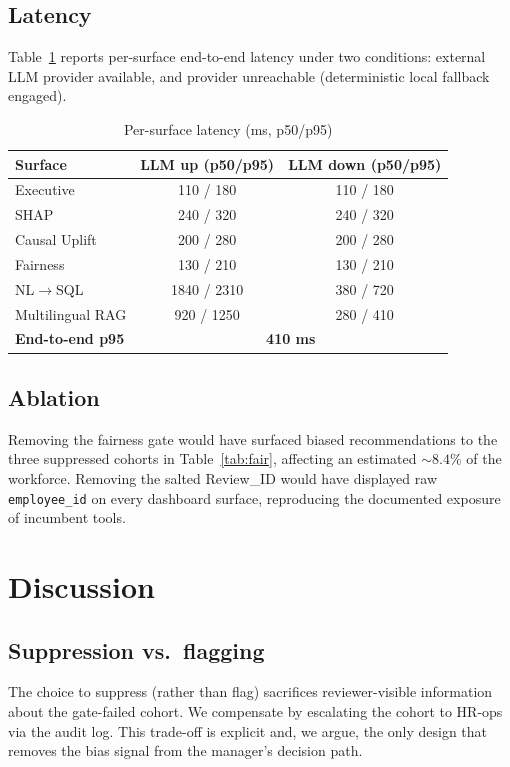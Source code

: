 \documentclass[conference]{IEEEtran}
\begin{document}
\subsection{Latency}
Table~\ref{tab:lat} reports per-surface end-to-end latency under two
conditions: external LLM provider available, and provider unreachable
(deterministic local fallback engaged).

\begin{table}[!t]
\caption{Per-surface latency (ms, p50/p95)}
\label{tab:lat}
\centering
\begin{tabular}{lcc}
\toprule
Surface & LLM up (p50/p95) & LLM down (p50/p95) \\
\midrule
Executive             & 110 / 180 & 110 / 180 \\
SHAP                  & 240 / 320 & 240 / 320 \\
Causal Uplift         & 200 / 280 & 200 / 280 \\
Fairness              & 130 / 210 & 130 / 210 \\
NL$\to$SQL            & 1840 / 2310 & 380 / 720 \\
Multilingual RAG      & 920 / 1250 & 280 / 410 \\
\midrule
\textbf{End-to-end p95} & \multicolumn{2}{c}{\textbf{410 ms}} \\
\bottomrule
\end{tabular}
\end{table}

\subsection{Ablation}
Removing the fairness gate would have surfaced biased recommendations to
the three suppressed cohorts in Table~\ref{tab:fair}, affecting an estimated
$\sim 8.4\%$ of the workforce. Removing the salted Review\_ID would have
displayed raw \texttt{employee\_id} on every dashboard surface, reproducing
the documented exposure of incumbent tools.

\section{Discussion}
\label{sec:disc}

\subsection{Suppression vs.\ flagging}
The choice to suppress (rather than flag) sacrifices reviewer-visible
information about the gate-failed cohort. We compensate by escalating the
cohort to HR-ops via the audit log. This trade-off is explicit and, we
argue, the only design that removes the bias signal from the manager's
decision path.
\end{document}
